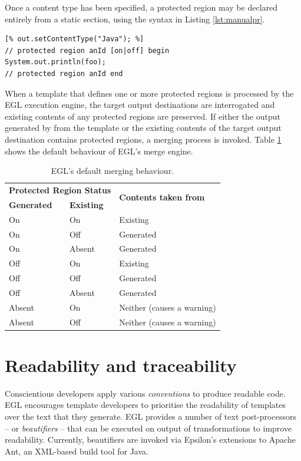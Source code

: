 Once a content type has been specified, a protected region may be declared entirely from a static section, using the syntax  in Listing \ref{lst:manualpr}.

\begin{lstlisting}[basicstyle=\ttfamily\footnotesize, tabsize=2, flexiblecolumns=true, caption=Declaring a protected region from within a static section., label=lst:manualpr]
[% out.setContentType("Java"); %]
// protected region anId [on|off] begin
System.out.println(foo);
// protected region anId end
\end{lstlisting}

When a template that defines one or more protected regions is
processed by the EGL execution engine, the target output destinations
are interrogated and existing contents of any protected regions are
preserved. If either the output generated by from the template or the
existing contents of the target output destination contains protected
regions, a merging process is invoked. Table \ref{tab:merging} shows
the default behaviour of EGL's merge engine.

\begin{table}[htbp]
  \begin{center}
  \begin{tabular}{|l|l|l|}
  \hline
  \multicolumn{2}{|l|}{\textbf{Protected Region Status}} & \multirow{2}{*}{\textbf{Contents taken from}} \\
  \textbf{Generated} & \textbf{Existing} & \\
  \hline
  On & On     & Existing  \\
  On & Off    & Generated \\
  On & Absent & Generated \\
  \hline
  Off & On     & Existing  \\
  Off & Off    & Generated \\
  Off & Absent & Generated \\
  \hline
  Absent & On  & Neither (causes a warning) \\
  Absent & Off & Neither (causes a warning) \\
  \hline
  \end{tabular}
  \end{center}
\caption{EGL's default merging behaviour.}
\label{tab:merging}
\end{table}

\section{Readability and traceability} 
Conscientious developers apply various \emph{conventions} to produce
readable code.  EGL encourages template developers to prioritise the
readability of templates over the text that they generate. EGL provides a number of text post-processors -- or
\textit{beautifiers} -- that can be executed on output of
transformations to improve readability.  Currently, beautifiers are
invoked via Epsilon's extensions to Apache Ant, an
XML-based build tool for Java.

